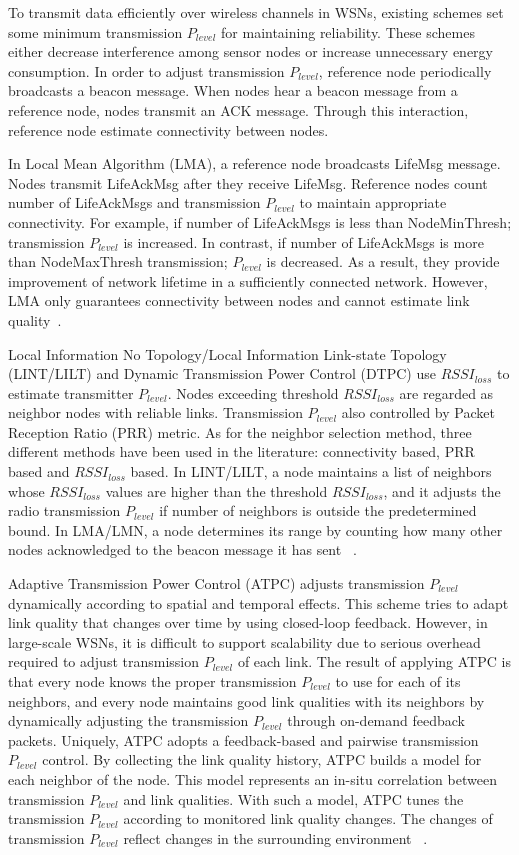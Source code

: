 \documentclass[12pt, conference, compsocconf, onecolumn, draftcls]{IEEEtran}
\begin{document}
To transmit data efficiently over wireless channels in WSNs, existing schemes set some minimum transmission $P_{level}$ for maintaining reliability. These schemes either decrease interference among sensor nodes or increase unnecessary energy consumption. In order to adjust transmission $P_{level}$, reference node periodically broadcasts a beacon message. When nodes hear a beacon message from a reference node, nodes transmit an ACK message. Through this interaction, reference node estimate connectivity between nodes.

In Local Mean Algorithm (LMA), a reference node broadcasts LifeMsg message. Nodes transmit LifeAckMsg after they receive LifeMsg. Reference nodes count number of LifeAckMsgs and transmission $P_{level}$ to maintain appropriate connectivity. For example, if number of LifeAckMsgs is less than NodeMinThresh; transmission $P_{level}$ is increased. In contrast, if number of LifeAckMsgs is more than NodeMaxThresh transmission; $P_{level}$ is decreased. As a result, they provide improvement of network lifetime in a sufficiently connected network. However, LMA only guarantees connectivity between nodes and cannot estimate link quality~\cite{5}.

Local Information No Topology/Local Information Link-state Topology (LINT/LILT) and Dynamic Transmission Power Control (DTPC) use $RSSI_{loss}$ to estimate transmitter $P_{level}$. Nodes exceeding threshold $RSSI_{loss}$  are regarded as neighbor nodes with reliable links. Transmission $P_{level}$ also controlled by Packet Reception Ratio (PRR) metric. As for the neighbor selection method, three different methods have been used in the literature: connectivity based, PRR based and $RSSI_{loss}$ based. In LINT/LILT, a node maintains a list of neighbors whose $RSSI_{loss}$ values are higher than the threshold $RSSI_{loss}$, and it adjusts the radio transmission $P_{level}$ if number of neighbors is outside the predetermined bound. In LMA/LMN, a node determines its range by counting how many other nodes acknowledged to the beacon message it has sent ~\cite{6}.

Adaptive Transmission Power Control (ATPC) adjusts transmission $P_{level}$ dynamically according to spatial and temporal effects. This scheme tries to adapt link quality that changes over time by using closed-loop feedback. However, in large-scale WSNs, it is difficult to support scalability due to serious overhead required to adjust transmission $P_{level}$ of each link. The result of applying ATPC is that every node knows the proper transmission $P_{level}$ to use for each of its neighbors, and every node maintains good link qualities with its neighbors by dynamically adjusting the transmission $P_{level}$ through on-demand feedback packets. Uniquely, ATPC adopts a feedback-based and pairwise transmission $P_{level}$ control. By collecting the link quality history, ATPC builds a model for each neighbor of the node. This model represents an in-situ correlation between transmission $P_{level}$ and link qualities. With such a model, ATPC tunes the transmission $P_{level}$ according to monitored link quality changes. The changes of transmission $P_{level}$ reflect changes in the surrounding environment ~\cite{7}.
\end{document}
